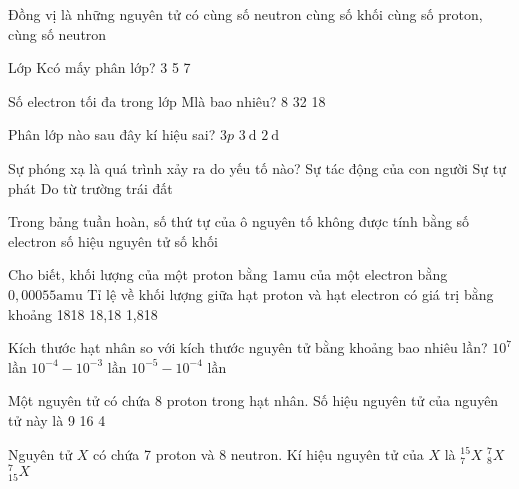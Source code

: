 \begin{ex}
	Đồng vị là những nguyên tử có
	{cùng số neutron}
	{cùng số khối}
	{cùng số proton, cùng số neutron}
\end{ex}
\begin{ex}
	Lớp Kcó mấy phân lớp?
	{3}
	{5}
	{7}
\end{ex}
\begin{ex}
	Số electron tối đa trong lớp Mlà bao nhiêu?
	{8}
	{32}
	{18}
\end{ex}
\begin{ex}
	Phân lớp nào sau đây kí hiệu sai?
	{$3 p$}
	{$3 \mathrm{~d}$}
	{$2 \mathrm{~d}$}
\end{ex}
\begin{ex}
	Sự phóng xạ là quá trình xảy ra do yếu tố nào?
	{Sự tác động của con người}
	{Sự tự phát}
	{Do từ trường trái đất}
\end{ex}
\begin{ex}
	Trong bảng tuần hoàn, số thứ tự của ô nguyên tố không được tính bằng
	{số electron}
	{số hiệu nguyên tử}
	{số khối}
\end{ex}
\begin{ex}
	Cho biết, khối lượng của một proton bằng $1 \mathrm{amu}$ của một electron bằng $0,00055 \mathrm{amu}$ Tỉ lệ về khối lượng giữa hạt proton và hạt electron có giá trị bằng khoảng
	{1818}
	{18,18}
	{1,818}
\end{ex}
\begin{ex}
	Kích thước hạt nhân so với kích thước nguyên tử bằng khoảng bao nhiêu lần?
	{$10^7$ lần}
	{$10^{-4}-10^{-3}$ lần}
	{$10^{-5}-10^{-4}$ lần}
\end{ex}
\begin{ex}
	Một nguyên tử có chứa 8 proton trong hạt nhân. Số hiệu nguyên tử của nguyên tử này là
	{9}
	{16}
	{4}
\end{ex}
\begin{ex}
	Nguyên tử $X$ có chứa 7 proton và 8 neutron. Kí hiệu nguyên tử của $X$ là
	{$_7^{15} X$}
	{$_8^7 X$}
	{$_{15}^7 X$}
\end{ex}
